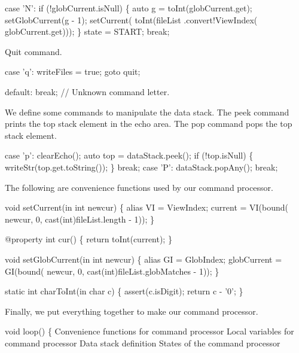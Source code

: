 case 'N':
  if (!globCurrent.isNull) \{
    auto g = toInt(globCurrent.get);
    setGlobCurrent(g - 1);
    setCurrent(
      toInt(fileList
            .convert!ViewIndex(
              globCurrent.get)));
  \}
  state = START;
  break;

\nwendcode{}Quit command.

\nwenddocs{}\plusendmoddef\nwstartdeflinemarkup\nwenddeflinemarkup
case 'q':
  writeFiles = true;
  goto quit;

\nwendcode{}\plusendmoddef\nwstartdeflinemarkup\nwenddeflinemarkup
default: break; // Unknown command letter.

\nwendcode{}We define some commands to manipulate the data stack. The peek
command prints the top stack element in the echo area. The pop command
pops the top stack element.

\nwenddocs{}\plusendmoddef\nwstartdeflinemarkup\nwenddeflinemarkup
case 'p':
  clearEcho();
  auto top = dataStack.peek();
  if (!top.isNull) \{
    writeStr(top.get.toString());
  \}
  break;
case 'P':
  dataStack.popAny();
  break;

\nwendcode{}The following are convenience functions used by our command
processor.

\nwenddocs{}\endmoddef\nwstartdeflinemarkup\nwenddeflinemarkup
void setCurrent(in int newcur)
\{
  alias VI = ViewIndex;
  current = VI(bound(
                 newcur,
                 0,
                 cast(int)fileList.length - 1));
\}

@property
int cur()
\{
  return toInt(current);
\}

void setGlobCurrent(in int newcur)
\{
  alias GI = GlobIndex;
  globCurrent = GI(bound(
                 newcur,
                 0,
                 cast(int)fileList.globMatches - 1));
\}

static int charToInt(in char c)
\{
  assert(c.isDigit);
  return c - '0';
\}

\nwendcode{}Finally, we put everything together to make our command processor.

\nwenddocs{}\endmoddef\nwstartdeflinemarkup\nwenddeflinemarkup
void loop()
\{
  \LA{}Convenience functions for command processor\RA{}
  \LA{}Local variables for command processor\RA{}
  \LA{}Data stack definition\RA{}
  \LA{}States of the command processor\RA{}

